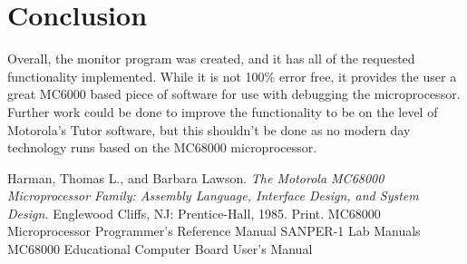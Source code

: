\documentclass[12pt]{article}
\begin{document}
			\section{Conclusion}
			Overall, the monitor program was created, and it has all of the requested functionality implemented. While it is not 100\% error free, it provides the user a great MC6000 based piece of software for use with debugging the microprocessor. Further work could be done to improve the functionality to be on the level of Motorola's Tutor software, but this shouldn't be done as no modern day technology runs based on the MC68000 microprocessor. 
			\begin{thebibliography}{1} 
				Harman, Thomas L., and Barbara Lawson. \emph{The Motorola MC68000 Microprocessor Family: Assembly Language, Interface Design, and System Design.} Englewood Cliffs, NJ: Prentice-Hall, 1985. Print. 
				 MC68000 Microprocessor Programmer's Reference Manual
				 SANPER-1 Lab Manuals
				 MC68000 Educational Computer Board User's Manual
			\end{thebibliography}
\end{document}
